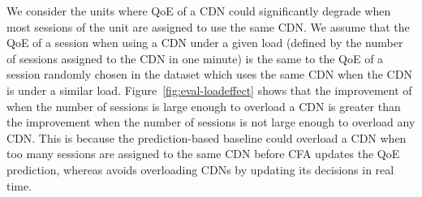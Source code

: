 We consider the units where QoE of a CDN could significantly degrade when most sessions of the unit are assigned to use the same CDN.
We assume that the QoE of a session when using a CDN under a given load (defined by the number of sessions assigned to the CDN in one minute) is the same to the QoE of a session randomly chosen in the dataset which uses the same CDN when the CDN is under a similar load. 
Figure~\ref{fig:eval-loadeffect} shows that the improvement of \name when the number of sessions is large enough to overload a CDN is greater than the improvement when the number of sessions is not large enough to overload any CDN.
This is because the prediction-based baseline could overload a CDN when too many sessions are assigned to the same CDN before CFA updates the QoE prediction, whereas \name avoids overloading CDNs by updating its decisions in real time.

%

